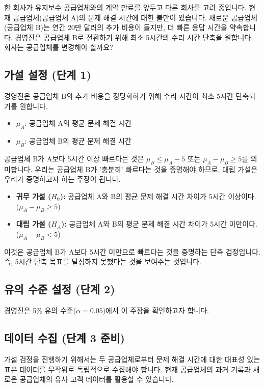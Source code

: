 \documentclass[11pt,a4paper]{article}
\theoremstyle{definition}
\begin{document}
\begin{examplebox}[title=시나리오: 유지보수 공급업체 변경 고려]
한 회사가 유지보수 공급업체와의 계약 만료를 앞두고 다른 회사를 고려 중입니다. 현재 공급업체(공급업체 A)의 문제 해결 시간에 대한 불만이 있습니다. 새로운 공급업체(공급업체 B)는 연간 20만 달러의 추가 비용이 들지만, 더 빠른 응답 시간을 약속합니다. 경영진은 공급업체 B로 전환하기 위해 최소 5시간의 수리 시간 단축을 원합니다. 회사는 공급업체를 변경해야 할까요?
\end{examplebox}

\subsection{가설 설정 (단계 1)}
경영진은 공급업체 B의 추가 비용을 정당화하기 위해 수리 시간이 최소 5시간 단축되기를 원합니다.
\begin{itemize}
    \item $\mu_A$: 공급업체 A의 평균 문제 해결 시간
    \item $\mu_B$: 공급업체 B의 평균 문제 해결 시간
\end{itemize}
공급업체 B가 A보다 5시간 이상 빠르다는 것은 $\mu_B \le \mu_A - 5$ 또는 $\mu_A - \mu_B \ge 5$를 의미합니다.
우리는 공급업체 B가 '충분히' 빠르다는 것을 증명해야 하므로, 대립 가설은 우리가 증명하고자 하는 주장이 됩니다.

\begin{itemize}
    \item \textbf{귀무 가설 ($H_0$):} 공급업체 A와 B의 평균 문제 해결 시간 차이가 5시간 이상이다.
    ($\mu_A - \mu_B \ge 5$)
    \item \textbf{대립 가설 ($H_A$):} 공급업체 A와 B의 평균 문제 해결 시간 차이가 5시간 미만이다.
    ($\mu_A - \mu_B < 5$)
\end{itemize}
이것은 공급업체 B가 A보다 5시간 미만으로 빠르다는 것을 증명하는 단측 검정입니다. 즉, 5시간 단축 목표를 달성하지 못했다는 것을 보여주는 것입니다.

\subsection{유의 수준 설정 (단계 2)}
경영진은 5\% 유의 수준($\alpha = 0.05$)에서 이 주장을 확인하고자 합니다.

\subsection{데이터 수집 (단계 3 준비)}
가설 검정을 진행하기 위해서는 두 공급업체로부터 문제 해결 시간에 대한 대표성 있는 표본 데이터를 무작위로 독립적으로 수집해야 합니다. 현재 공급업체의 과거 기록과 새로운 공급업체의 유사 고객 데이터를 활용할 수 있습니다.
\end{document}
